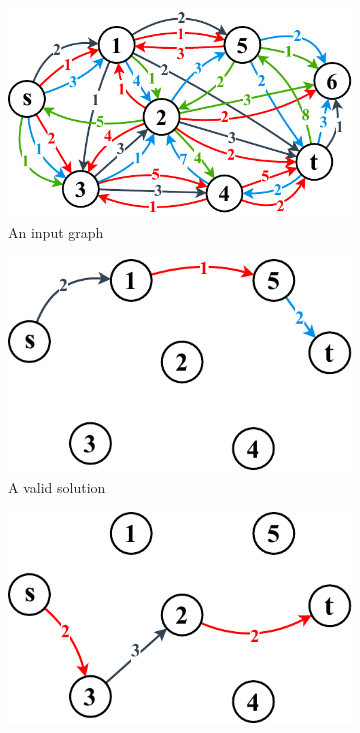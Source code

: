 \bigskip
\setlength{\intextsep}{3pt}
\renewcommand{\scalefigure}{0.7}
\begin{figure}[htbp]
	\centering
	\begin{subfigure}{.49\linewidth}
		\centering
		\includegraphics[scale=\scalefigure]{Figures/chap 2/Bold Input Graph.pdf}
		\caption{An input graph}
		\label{fig:input_graph}
	\end{subfigure}
	\begin{subfigure}{.49\linewidth}
		\centering
		\includegraphics[scale=\scalefigure]{Figures/chap 2/Valid Solution.pdf}
		\caption{A valid solution}
		\label{fig:valid_path_a}
	\end{subfigure}
	\begin{subfigure}{.49\linewidth}
		\centering
		\includegraphics[scale=\scalefigure]{Figures/chap 2/Invalid Solution.pdf}

\end{subfigure}
\end{figure}
